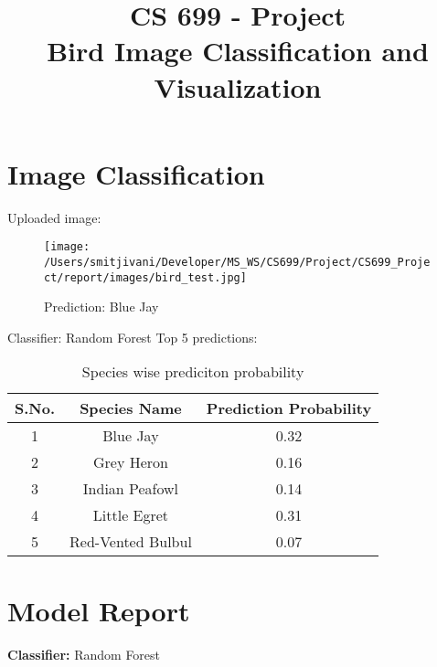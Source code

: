 \documentclass{article}
\date{}
\title{CS 699 - Project\\ Bird Image Classification and Visualization}
\begin{document}
\maketitle

\section{Image Classification}

\noindent Uploaded image:

\begin{figure}[h!]
\centering
\texttt{[image: /Users/smitjivani/Developer/MS\_WS/CS699/Project/CS699\_Project/report/images/bird\_test.jpg]}
\caption*{Prediction: Blue Jay}
\label{fig:method}
\end{figure}

\noindent Classifier: Random Forest
\newline
\newline
\newline
\noindent Top 5 predictions:
\newline
\begin{table}[h!]
\centering
\begin{tabular}{|c|c|c|} 
\hline
 S.No. & Species Name & Prediction Probability\\ 
\hline
 1 & Blue Jay & 0.32 \\ 
 \hline
 2 & Grey Heron & 0.16 \\  
 \hline
 3 & Indian Peafowl & 0.14 \\    
 \hline
 4 & Little Egret & 0.31 \\    
 \hline
 5 & Red-Vented Bulbul & 0.07 \\    
 \hline
\end{tabular}
\caption{Species wise prediciton probability}
\label{table:data}
\end{table}




\newpage
\section{Model Report}

\textbf{Classifier:} Random Forest
\newline
\end{document}
